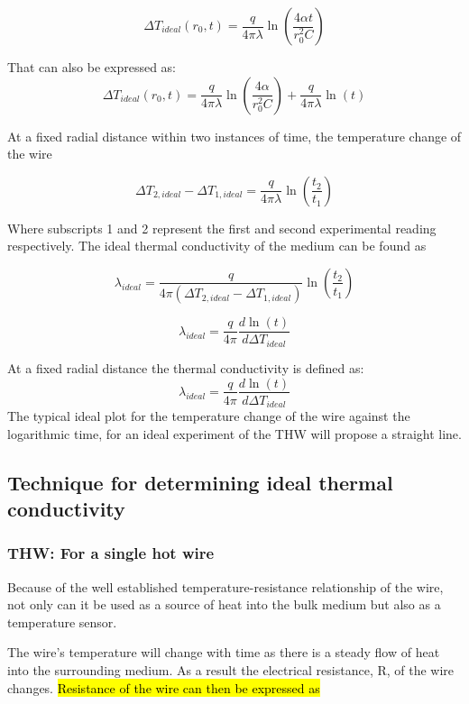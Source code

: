 \documentclass{article}
\begin{document}
\begin{equation} \label{eq:ideal}
\Delta T_{ideal}(r_0,t) =  \frac{q}{4 \pi \lambda} \ln \left( \frac{4 \alpha t}{r^2_0 C}\right)
\end{equation}

That can also be expressed as:
	\begin{equation} \label{eq:ideal2}
	\Delta T_{ideal}(r_0,t) =  \frac{q}{4 \pi \lambda} \ln \left( \frac{4 \alpha }		{r^2_0 C}\right) + \frac{q}{4 \pi \lambda} \ln \left( t \right)
	\end{equation}

At a fixed radial distance within two instances of time, the temperature change of the wire

$$\Delta T_{2,ideal} - \Delta T_{1,ideal} = \frac{q}{4 \pi \lambda} \ln \left( \frac{t_2}{t_1} \right)$$

Where subscripts 1 and 2 represent the first and second experimental reading respectively. The ideal thermal conductivity of the medium can be found as

$$\lambda_{ideal} =  \frac{q}{4 \pi \left( \Delta T_{2,ideal} - \Delta T_{1,ideal} \right)}\ln \left( \frac{t_2}{t_1} \right)$$

\newpage

	\begin{equation} \label{eq:idealconductivity}
\lambda_{ideal} =  \frac{q}{4 \pi} \frac{d\ln \left( t \right)}{d\Delta T_{ideal}}
	\end{equation}
	
At a fixed radial distance the thermal conductivity is defined as:
$$\lambda_{ideal} =  \frac{q}{4 \pi} \frac{d\ln \left( t \right)}{d\Delta T_{ideal}}$$
The typical ideal plot for the temperature change of the wire against the logarithmic time, for an ideal experiment of the THW will propose a straight line.

\subsection{Technique for determining ideal thermal conductivity}
\subsubsection{THW: For a single hot wire}
Because of the well established temperature-resistance relationship of the wire, not only can it be used as a source of heat into the bulk medium but also as a temperature sensor.

The wire’s temperature will change with time as there is a steady flow of heat into the  surrounding medium. As a result the electrical resistance, R, of the wire changes.
\hl{Resistance of the wire can then be expressed as}
\end{document}
